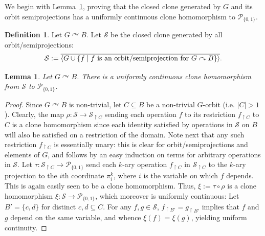 \documentclass{article}
\newtheorem{lemma}[theorem]{Lemma}
\theoremstyle{remark}
\theoremstyle{definition}
\newtheorem{definition}[theorem]{Definition}
\def\acts{\curvearrowright}
\begin{document}
We begin with Lemma~\ref{thm:trivialidentities}, proving that the closed clone generated by $G$ and its orbit semiprojections has a uniformly continuous clone homomorphism to $\mathcal{P}_{\{0,1\}}$. %


\begin{definition}\label{def:homomcont} Let $G\acts B$. Let $\mathcal{S}$ be the closed clone generated by all orbit\-/semiprojections:
\[\mathcal{S}:=\overline{\langle G\cup\{ f\; \vert\; f \text{ is an orbit\-/semiprojection for }G\acts B\}\rangle}.\]
\end{definition}


\begin{lemma}\label{thm:trivialidentities} Let $G\acts B$. There is a uniformly continuous clone homomorphism from %
 $\mathcal{S}$ 
  to $\mathcal{P}_{\{0,1\}}$.%
\end{lemma}
\begin{proof} Since $G\acts B$ is non-trivial, let $C\subseteq B$ be a non-trivial $G$-orbit (i.e. $|C|>1$). Clearly, the map $\rho:\mathcal{S}\to\mathcal{S}_{\upharpoonright C}$ sending each operation $f$ to its restriction $f_{\upharpoonright C}$ to $C$  is a clone homomorphism since each identity satisfied by operations in $\mathcal{S}$ on $B$ will also be satisfied on a restriction of the domain. Note next that any such  restriction $f_{\upharpoonright C}$  is essentially unary: this is clear for orbit\-/semiprojections and elements of $G$, and follows by an easy induction on terms for arbitrary operations in $\mathcal{S}$. Let $\tau:\mathcal{S}_{\upharpoonright C} \to\mathcal{P}_{\{0,1\}}$ send each $k$-ary operation $f_{\upharpoonright C}$ in $\mathcal{S}_{\upharpoonright C}$ to the $k$-ary projection to the $i$th coordinate $\pi_i^k$, where $i$ is the variable on which $f$ depends. This is again easily seen to be a clone homomorphism. Thus, $\xi:=\tau\circ\rho$ is a clone homomorphism $\xi:  \mathcal{S}\to \mathcal{P}_{\{0,1\}}$, which moreover is uniformly continuous: Let $B'=\{c,d\}$ for distinct $c,d\subseteq C$. For any $f,g\in\mathcal{S}$, $f_{\upharpoonright B'}=g_{\upharpoonright B'}$ implies that $f$ and $g$ depend on the same variable, and whence  $\xi(f)=\xi(g)$, yielding uniform continuity.
\end{proof}
\end{document}
